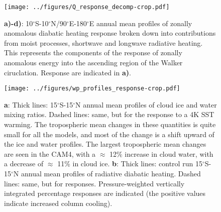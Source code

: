 \documentclass[letterpaper,12pt,titlepage,oneside,final]{book}
\begin{document}
\begin{figure}[H]
\centering
\noindent\texttt{[image: ../figures/Q\_response\_decomp-crop.pdf]}\hfill
\caption{\textbf{a)-d)}: 10$^\circ$S-10$^\circ$N/90$^\circ$E-180$^\circ$E annual mean profiles of zonally anomalous diabatic heating response broken down into contributions from moist processes, shortwave and longwave radiative heating. This represents the components of the response of zonally anomalous energy into the ascending region of the Walker ciruclation. Response are indicated in \textbf{a)}.}

\end{figure}

\begin{figure}[H]
\centering
\noindent\texttt{[image: ../figures/wp\_profiles\_response-crop.pdf]}\hfill
\caption{\textbf{a}: Thick lines: 15$^\circ$S-15$^\circ$N annual mean profiles of cloud ice and water mixing ratios. Dashed lines: same, but for the response to a 4K SST warming. The tropospheric mean changes in these quantities is quite small for all the models, and most of the change is a shift upward of the ice and water profiles. The largest tropospheric mean changes are seen in the CAM4, with a $\approx$ 12\% increase in cloud water, with a decrease of $\approx$ 11\% in cloud ice. \textbf{b}: Thick lines: control run 15$^\circ$S-15$^\circ$N annual mean profiles of radiative diabatic heating. Dashed lines: same, but for responses. Pressure-weighted vertically integrated percentage responses are indicated (the positive values indicate increased column cooling).}
\end{figure}
\end{document}
